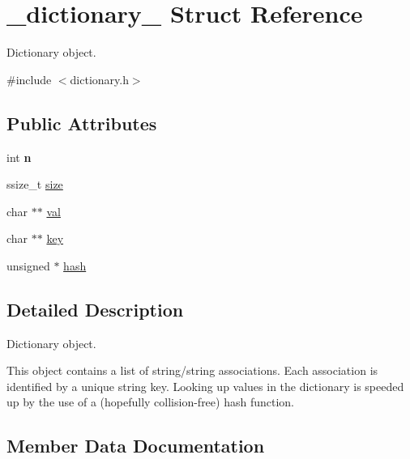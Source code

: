 \hypertarget{struct__dictionary__}{}\section{\+\_\+dictionary\+\_\+ Struct Reference}
\label{struct__dictionary__}


Dictionary object.  




{\ttfamily \#include $<$dictionary.\+h$>$}

\subsection*{Public Attributes}
\begin{DoxyCompactItemize}
\item 
\mbox{\label{struct__dictionary___ac93e659a505b71aa87b8b558b55ee872}} 
int {\bfseries n}
\item 
ssize\+\_\+t \hyperlink{struct__dictionary___a8be0f96d0b5a75d61775306d5e908867}{size}
\item 
char $\ast$$\ast$ \hyperlink{struct__dictionary___a7a89c8fb24cb365745431d881f8f0afd}{val}
\item 
char $\ast$$\ast$ \hyperlink{struct__dictionary___a3c962bd7edff49be125396596d1bec75}{key}
\item 
unsigned $\ast$ \hyperlink{struct__dictionary___a017aee3083b2fc453bcf2d7b5b51af86}{hash}
\end{DoxyCompactItemize}


\subsection{Detailed Description}
Dictionary object. 

This object contains a list of string/string associations. Each association is identified by a unique string key. Looking up values in the dictionary is speeded up by the use of a (hopefully collision-\/free) hash function. 

\subsection{Member Data Documentation}
\mbox{\label{struct__dictionary___a017aee3083b2fc453bcf2d7b5b51af86}} 
